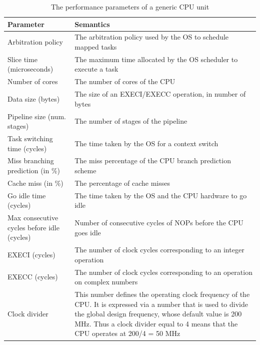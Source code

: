 \documentclass{llncs}
\begin{document}
%
\begin{table}[!htbp]
\begin{center}
	\caption{The performance parameters of a generic CPU unit}
	\label{tab:PerfParamCPU}
	\begin{tabular}{| >{\centering\arraybackslash}p{7cm} | >{\centering\arraybackslash}p{7cm} |} \hline
	\textbf{Parameter}				& \textbf{Semantics}	\\ \hline
	Arbitration policy				& The arbitration policy used by the OS to schedule mapped
	tasks\\ \hline
	Slice time (microseconds)			& The maximum time allocated by the OS scheduler to execute a task\\
	\hline
	Number of cores					& The number of cores of the CPU\\ \hline
	Data size (bytes)				& The size of an EXECI/EXECC operation, in number of bytes\\
	\hline
        Pipeline size (num. stages)			& The number of stages of the pipeline\\ \hline
	Task switching time (cycles)			& The time taken by the OS for a context switch\\ \hline
	Miss branching prediction (in \%)		& The miss percentage of the CPU branch prediction scheme\\
	\hline
	Cache miss (in \%)				& The percentage of cache misses\\ \hline
	Go idle time (cycles)				& The time taken by the OS and the CPU hardware to go idle\\ \hline
	Max consecutive cycles before idle (cycles)	& Number of consecutive cycles of NOPs before the CPU goes idle\\ \hline
	EXECI (cycles)					& The number of clock cycles corresponding to an integer
	operation \\ \hline
	EXECC (cycles)					& The number of clock cycles corresponding to an operation on
	complex numbers \\ \hline
	Clock divider					& This number defines the operating clock frequency of the
	CPU.
	It is expressed via a number that is used to divide the global design frequency, whose default value is 200 MHz.
	Thus a clock divider equal to 4 means that the CPU operates at 200/4 = 50 MHz
	\\
	\hline
	\end{tabular}
\end{center}
\end{table}
%
\end{document}
